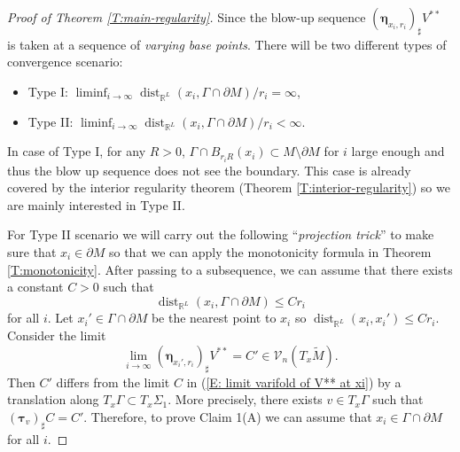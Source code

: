 \documentclass[10pt]{amsart}
\theoremstyle{definition}
\theoremstyle{remark}
\numberwithin{equation}{section}
\newcommand{\V}{\mathcal{V}}
\newcommand{\R}{\mathbb{R}}
\newcommand{\btau}{\boldsymbol \tau}
\newcommand{\bleta}{\boldsymbol \eta}
\newcommand{\tM}{\widetilde{M}}
\newcommand{\dist}{\operatorname{dist}}
\begin{document}
\begin{proof}[Proof of Theorem \ref{T:main-regularity}]
Since the blow-up sequence $(\bleta_{x_i,r_i})_\sharp V^{**}$ is taken at a sequence of \emph{varying base points}. There will be two different types of convergence scenario:
\begin{itemize}
\item Type I: $\liminf_{i \to \infty} \dist_{\R^L}(x_i, \Gamma\cap \partial M)/r_i=\infty$,
\item Type II: $\liminf_{i \to \infty} \dist_{\R^L}(x_i, \Gamma\cap \partial M)/r_i < \infty$.
\end{itemize}
In case of Type I, for any $R>0$, $\Gamma\cap B_{r_i R}(x_i) \subset M \setminus \partial M$ for $i$ large enough and thus the blow up sequence does not see the boundary. This case is already covered by the interior regularity theorem (Theorem \ref{T:interior-regularity}) so we are mainly interested in Type II.

For Type II scenario we will carry out the following ``\emph{projection trick}'' to make sure that $x_i \in \partial M$ so that we can apply the monotonicity formula in Theorem \ref{T:monotonicity}. After passing to a subsequence, we can assume that there exists a constant $C>0$ such that
\[ \dist_{\R^L}(x_i, \Gamma\cap \partial M) \leq C r_i \]
for all $i$. Let $x_i' \in \Gamma \cap \partial M$ be the nearest point to $x_i$ so $\dist_{\R^L}(x_i,x_i') \leq C r_i$. Consider the limit
\[ \lim_{i \to \infty} (\bleta_{x_i',r_i})_\sharp V^{**}=C' \in \V_n(T_x \tM). \]
Then $C'$ differs from the limit $C$ in (\ref{E: limit varifold of V** at xi}) by a translation along $T_x \Gamma \subset T_x\Sigma_1$. More precisely, there exists $v \in T_x \Gamma$ such that $(\btau_v)_\sharp C=C'$. Therefore, to prove Claim 1(A) we can assume that $x_i \in \Gamma \cap \partial M$ for all $i$. 


\end{proof}
\end{document}
